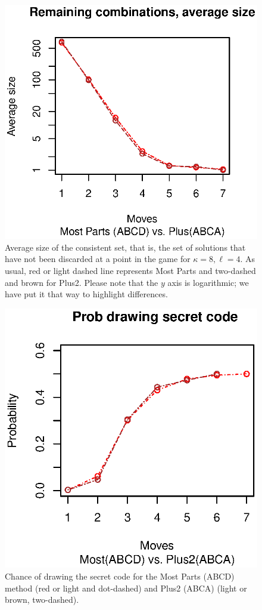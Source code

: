\documentclass[preprint,12pt]{elsarticle}
\begin{document}
\begin{figure}[!htb]
\centering
\includegraphics{csets-most-plus2-abca-48.eps}
\caption{Average size of the consistent set, that is, the set of
  solutions that have not been discarded at a point in the game for
  $\kappa=8, \ell=4$. As usual, red or light dashed line 
  represents Most Parts  and two-dashed and brown for Plus2. Please note that the $y$
  axis is logarithmic; we have put it that way to highlight
  differences. \label{fig:cset:mp:plus:48}}
\end{figure} 
%
\begin{figure}[!htb]
\centering
\includegraphics{prob-most-plus2-abca-48.eps}
\caption{Chance of drawing the secret code for the
  Most Parts (ABCD) method (red or light and dot-dashed) and Plus2 (ABCA) (light or
  brown, two-dashed).\label{fig:prob:mp:abca:48}} 
\end{figure} 
\end{document}
